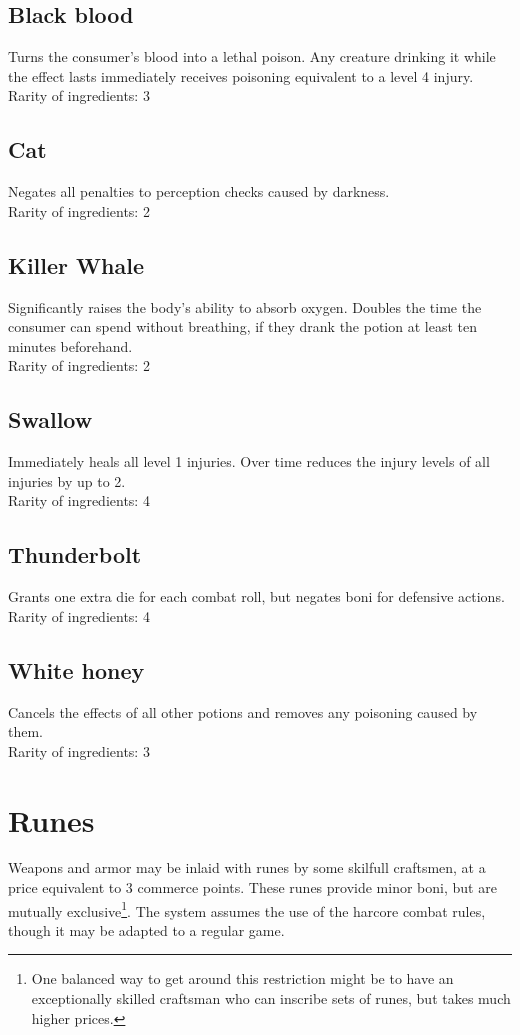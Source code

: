 \documentclass[parskip=full,11pt,%
footheight=38pt]{scrreport}
\begin{document}
\subsection{Black blood}
Turns the consumer's blood into a lethal poison. Any creature drinking it while the effect lasts immediately receives
poisoning equivalent to a level 4 injury.
\\[2ex]
Rarity of ingredients: 3

\subsection{Cat}
Negates all penalties to perception checks caused by darkness.
\\[2ex]
Rarity of ingredients: 2

\subsection{Killer Whale}
Significantly raises the body's ability to absorb oxygen. Doubles the time the consumer can spend without breathing,
if they drank the potion at least ten minutes beforehand.
\\[2ex]
Rarity of ingredients: 2

\subsection{Swallow}
Immediately heals all level 1 injuries. Over time reduces the injury levels of all injuries by up to 2.
\\[2ex]
Rarity of ingredients: 4

\subsection{Thunderbolt}
Grants one extra die for each combat roll, but negates boni for defensive actions.
\\[2ex]
Rarity of ingredients: 4

\subsection{White honey}
Cancels the effects of all other potions and removes any poisoning caused by them.
\\[2ex]
Rarity of ingredients: 3

\section{Runes}
Weapons and armor may be inlaid with runes by some skilfull craftsmen, at a price equivalent to
3 commerce points. These runes provide minor boni, but are mutually exclusive\footnote{One balanced way
to get around this restriction might be to have an exceptionally skilled craftsman who can inscribe
sets of runes, but takes much higher prices.}.
The system assumes the use of the harcore combat rules, though it may be adapted to a regular game.
\end{document}
